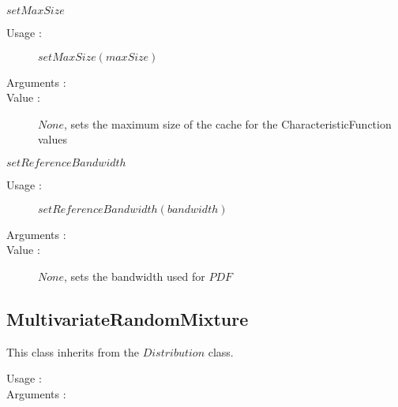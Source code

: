 \begin{description}
\begin{description}
  \item $setMaxSize$
    \begin{description}
    \item[Usage :]  $setMaxSize(maxSize)$
    \item[Arguments :]  \strut
    \item[Value :] $None$, sets the maximum size of the cache for the CharacteristicFunction values
    \end{description}

  \item $setReferenceBandwidth$
    \begin{description}
    \item[Usage :]  $setReferenceBandwidth(bandwidth)$
    \item[Arguments :]  \strut
    \item[Value :] $None$, sets the bandwidth used for $PDF$
    \end{description}

  \end{description}

\end{description}

\subsection{MultivariateRandomMixture}
This class inherits from the $Distribution$ class.

\begin{description}
\item[Usage :]  \strut
\item[Arguments :] \strut
\end{description}
